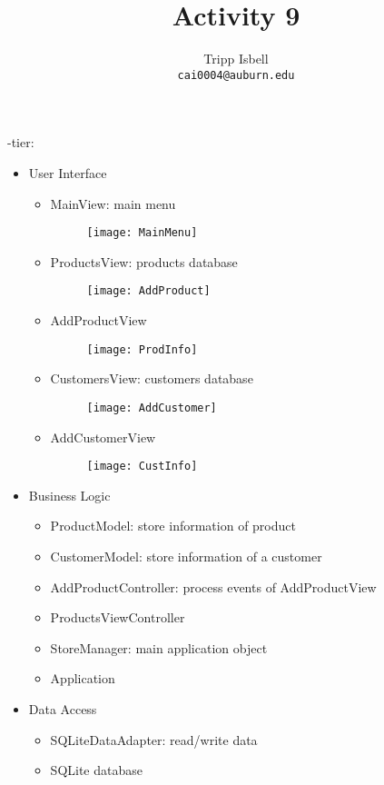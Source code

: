 \documentclass[notitlepage,11pt]{report}
\title{Activity 9}
\author{Tripp Isbell\\
	\texttt{cai0004@auburn.edu}}
\date{}
\begin{document}
-tier:
\begin{itemize}
	\item User Interface
	\begin{itemize}
		\item MainView: main menu
		\begin{figure}[h] 
			\texttt{[image: MainMenu]}
		\end{figure}
		\item ProductsView: products database
		\begin{figure}[h]
			\texttt{[image: AddProduct]}
		\end{figure}
		\item AddProductView 
		\begin{figure}[h]
			\texttt{[image: ProdInfo]}
		\end{figure}
		\newpage
		\item CustomersView: customers database
		\begin{figure}[h]
			\texttt{[image: AddCustomer]}
		\end{figure}
		\item AddCustomerView 
		\begin{figure}[h]
			\texttt{[image: CustInfo]}
		\end{figure}
	\end{itemize}
	\item Business Logic
	\begin{itemize}
		\item ProductModel: store information of product
		\item CustomerModel: store information of a customer
		\item AddProductController: process events of AddProductView
		\item ProductsViewController
		\item StoreManager: main application object
		\item Application
	\end{itemize}
	\item Data Access
	\begin{itemize}
		\item SQLiteDataAdapter: read/write data
		\item SQLite database
	\end{itemize}
\end{itemize}
\end{document}
